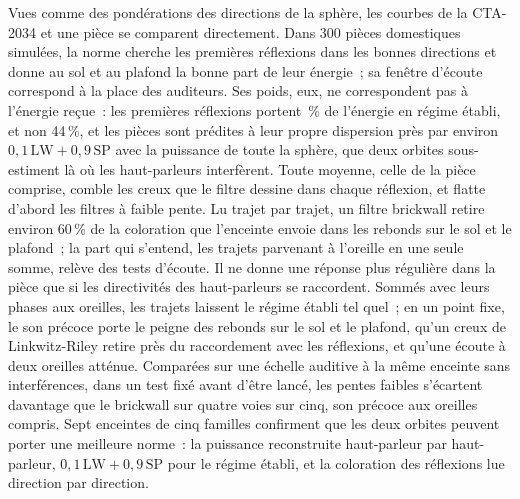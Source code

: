 \documentclass[11pt,a4paper]{article}
\begin{document}
Vues comme des pondérations des directions de la sphère, les courbes de la CTA-2034 et une pièce se
comparent directement. Dans 300 pièces domestiques simulées, la norme cherche les premières réflexions
dans les bonnes directions et donne au sol et au plafond la bonne part de leur énergie~; sa fenêtre
d'écoute correspond à la place des auditeurs. Ses poids, eux, ne correspondent pas à l'énergie reçue~:
les premières réflexions portent \nfirstShare\,\% de l'énergie en régime établi, et non 44\,\%, et les
pièces sont prédites à leur propre dispersion près par environ $0,1\,\mathrm{LW} + 0,9\,\mathrm{SP}$ avec la
puissance de toute la sphère, que deux orbites sous-estiment là où les haut-parleurs interfèrent. Toute
moyenne, celle de la pièce comprise, comble les creux que le filtre dessine dans chaque réflexion, et
flatte d'abord les filtres à faible pente. Lu trajet par trajet, un filtre brickwall retire environ
60\,\% de la coloration que l'enceinte envoie dans les rebonds sur le sol et le plafond~; la part qui
s'entend, les trajets parvenant à l'oreille en une seule somme, relève des tests d'écoute. Il ne donne
une réponse plus régulière dans la pièce que si les directivités des haut-parleurs se raccordent. Sommés avec leurs phases aux
oreilles, les trajets laissent le régime établi tel quel~; en un point fixe, le son précoce porte le
peigne des rebonds sur le sol et le plafond, qu'un creux de Linkwitz-Riley retire près du raccordement
avec les réflexions, et qu'une écoute à deux oreilles atténue. Comparées sur une échelle auditive à la
même enceinte sans interférences, dans un test fixé avant d'être lancé, les pentes faibles s'écartent
davantage que le brickwall sur quatre voies sur cinq, son précoce aux oreilles compris. Sept
enceintes de cinq familles confirment que les deux orbites peuvent porter une meilleure norme~: la
puissance reconstruite haut-parleur par haut-parleur, $0,1\,\mathrm{LW} + 0,9\,\mathrm{SP}$ pour le régime
établi, et la coloration des réflexions lue direction par direction.
\end{document}
